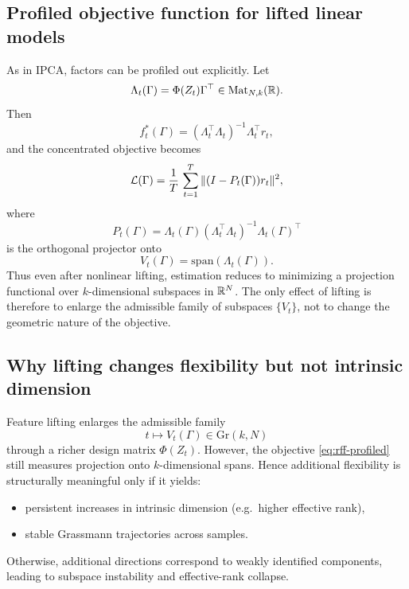 \documentclass[twoside,11pt,letter]{article}
\begin{document}
\subsection{Profiled objective function for lifted linear models}

As in IPCA, factors can be profiled out explicitly. Let
\begin{equation*}
\Lambda_t(\Gamma)=\Phi(Z_t)\Gamma^\top\in \mathrm{Mat}_{N,k}(\mathbb{R}).
\end{equation*}
Then
\begin{equation*}
f_t^*(\Gamma)=(\Lambda_t^\top\Lambda_t)^{-1}\Lambda_t^\top r_t,
\end{equation*}
and the concentrated objective becomes
\begin{equation}
\label{eq:rff-profiled}
\mathcal{L}(\Gamma)=\frac{1}{T}\,\sum_{t=1}^T\|(I-P_t(\Gamma))r_t\|^2,
\end{equation}
where
\begin{equation*}
P_t(\Gamma)=\Lambda_t(\Gamma)(\Lambda_t^\top\Lambda_t)^{-1}\Lambda_t(\Gamma)^\top
\end{equation*}
is the orthogonal projector onto
\begin{equation*}
V_t(\Gamma)=\mathrm{span}(\Lambda_t(\Gamma)).
\end{equation*}
Thus even after nonlinear lifting, estimation reduces to minimizing a projection functional over $k$-dimensional subspaces in $\mathbb{R}^N$. The only effect of lifting is therefore to enlarge the admissible family of subspaces $\{V_t\}$, not to change the geometric nature of the objective.

\subsection{Why lifting changes flexibility but not intrinsic dimension}

Feature lifting enlarges the admissible family
\begin{equation*}
t\longmapsto V_t(\Gamma)\in \mathrm{Gr}(k,N)
\end{equation*}
through a richer design matrix $\Phi(Z_t)$. However, the objective \eqref{eq:rff-profiled} still measures projection onto $k$-dimensional spans. Hence additional flexibility is structurally meaningful only if it yields:
\begin{itemize}
\item[(i)] persistent increases in intrinsic dimension (e.g.\ higher effective rank),
\item[(ii)] stable Grassmann trajectories across samples.
\end{itemize}
Otherwise, additional directions correspond to weakly identified components, leading to subspace instability and effective-rank collapse.
\end{document}
